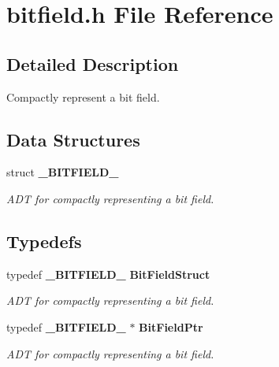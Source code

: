 \section{bitfield.h File Reference}
\label{bitfield_8h}


\subsection{Detailed Description}
Compactly represent a bit field. 



\subsection*{Data Structures}
\begin{CompactItemize}
\item 
struct {\bf \_\-BITFIELD\_\-}
\begin{CompactList}\small\item\em ADT for compactly representing a bit field. \item\end{CompactList}\end{CompactItemize}
\subsection*{Typedefs}
\begin{CompactItemize}
\item 
typedef {\bf \_\-BITFIELD\_\-} {\bf Bit\-Field\-Struct}
\begin{CompactList}\small\item\em ADT for compactly representing a bit field. \item\end{CompactList}\item 
typedef {\bf \_\-BITFIELD\_\-} $\ast$ {\bf Bit\-Field\-Ptr}
\begin{CompactList}\small\item\em ADT for compactly representing a bit field. \item\end{CompactList}\end{CompactItemize}
